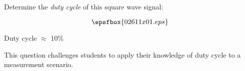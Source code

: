 

Determine the {\it duty cycle} of this square wave signal:

$$\epsfbox{02611x01.eps}$$







Duty cycle $\approx$ 10\%







This question challenges students to apply their knowledge of duty cycle to a measurement scenario.




